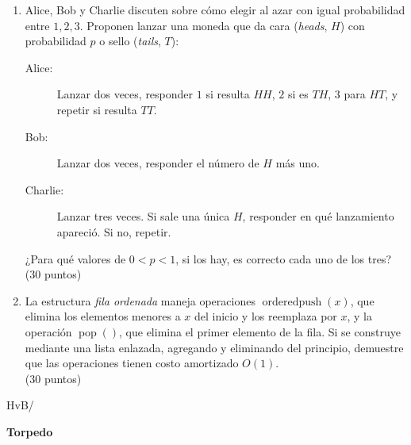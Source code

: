 \documentclass[english, spanish, fleqn]{article}
\begin{document}
\begin{enumerate}
    si se permite solo conectar \(a_i\) con \(b_i\)
    de manera que no se crucen puentes
    (las posiciones en ambas riberas
     no necesariamente vienen en orden).
    Plantee programación dinámica
    (la recurrencia con sus condiciones de borde,
     cómo almacenar los resultados intermedios,
     cuál es el resultado final
     y el orden de cálculo)
    para resolver este problema.
    \\ \hspace*{\fill}(30 puntos)
  \item %
    Alice, Bob y Charlie discuten
    sobre cómo elegir al azar con igual probabilidad entre \(1, 2, 3\).
    Proponen lanzar una moneda
    que da cara
    (\emph{\foreignlanguage{english}{heads}}, \(H\))
    con probabilidad \(p\)
    o sello (\emph{\foreignlanguage{english}{tails}}, \(T\)):
    \begin{description}
    \item[Alice:]
      Lanzar dos veces,
      responder \(1\) si resulta \(H H\),
      \(2\) si es \(T H\),
      \(3\) para \(H T\),
      y repetir si resulta \(T T\).
    \item[Bob:]
      Lanzar dos veces,
      responder el número de \(H\) más uno.
    \item[Charlie:]
      Lanzar tres veces.
      Si sale una única \(H\),
      responder en qué lanzamiento apareció.
      Si no,
      repetir.
    \end{description}
    ¿Para qué valores de \(0 < p < 1\),
    si los hay,
    es correcto cada uno de los tres?
    \\ \hspace*{\fill}(30 puntos)
  \item %
    La estructura \emph{fila ordenada}
    maneja operaciones \(\operatorname{orderedpush}(x)\),
    que elimina los elementos menores a \(x\) del inicio
    y los reemplaza por \(x\),
    y la operación \(\operatorname{pop}()\),
    que elimina el primer elemento de la fila.
    Si se construye mediante una lista enlazada,
    agregando y eliminando del principio,
    demuestre que las operaciones tienen costo amortizado \(O(1)\).
    \\ \hspace*{\fill}(30 puntos)
  \end{enumerate}
  \vspace*{\fill}\hspace*{\fill}HvB/\LaTeXe
\pagebreak[4]
\begin{center}
  \huge\textbf{Torpedo}
\end{center}
\end{document}

